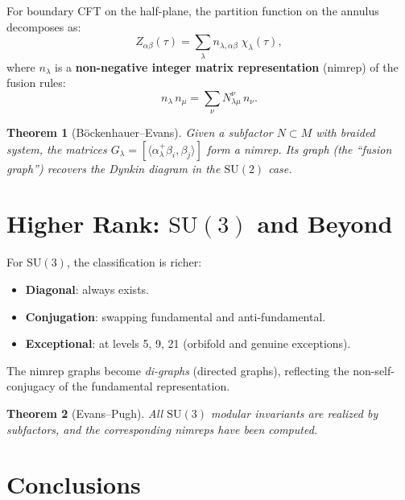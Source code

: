 \documentclass[11pt,a4paper]{article}
\newtheorem{theorem}{Theorem}[section]
\begin{document}
For boundary CFT on the half-plane, the partition function on the annulus
decomposes as:
\begin{equation}
  Z_{\alpha\beta}(\tau) = \sum_\lambda n_{\lambda,\alpha\beta}\; \chi_\lambda(\tau),
\end{equation}
where $n_\lambda$ is a \textbf{non-negative integer matrix representation}
(nimrep) of the fusion rules:
\begin{equation}
  n_\lambda\, n_\mu = \sum_\nu N_{\lambda\mu}^\nu\, n_\nu.
\end{equation}

\begin{theorem}[B\"ockenhauer--Evans]
Given a subfactor $N \subset M$ with braided system, the matrices
$G_\lambda = [\langle \alpha^+_\lambda \beta_i, \beta_j\rangle]$
form a nimrep. Its graph (the ``fusion graph'') recovers the Dynkin
diagram in the $\mathrm{SU}(2)$ case.
\end{theorem}

\section{Higher Rank: $\mathrm{SU}(3)$ and Beyond}

For $\mathrm{SU}(3)$, the classification is richer:
\begin{itemize}[nosep]
  \item \textbf{Diagonal}: always exists.
  \item \textbf{Conjugation}: swapping fundamental and anti-fundamental.
  \item \textbf{Exceptional}: at levels 5, 9, 21 (orbifold and genuine exceptions).
\end{itemize}

The nimrep graphs become \emph{di-graphs} (directed graphs), reflecting
the non-self-conjugacy of the fundamental representation.

\begin{theorem}[Evans--Pugh]
All $\mathrm{SU}(3)$ modular invariants are realized by subfactors,
and the corresponding nimreps have been computed.
\end{theorem}

\section{Conclusions}
\end{document}
